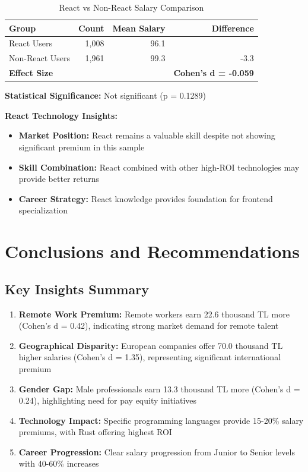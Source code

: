\documentclass[12pt,a4paper]{article}
\begin{document}
\begin{table}[H]
\centering
\begin{tabular}{lrrr}
\toprule
\textbf{Group} & \textbf{Count} & \textbf{Mean Salary} & \textbf{Difference} \\
\midrule
React Users & 1,008 & 96.1 & \\
Non-React Users & 1,961 & 99.3 & -3.3 \\
\midrule
\textbf{Effect Size} & & & \textbf{Cohen's d = -0.059} \\
\bottomrule
\end{tabular}
\caption{React vs Non-React Salary Comparison}
\end{table}

\textbf{Statistical Significance:} Not significant (p = 0.1289)

\textbf{React Technology Insights:}
\begin{itemize}
    \item \textbf{Market Position:} React remains a valuable skill despite not showing significant premium in this sample
    \item \textbf{Skill Combination:} React combined with other high-ROI technologies may provide better returns
    \item \textbf{Career Strategy:} React knowledge provides foundation for frontend specialization
\end{itemize}

\section{Conclusions and Recommendations}

\subsection{Key Insights Summary}
\begin{enumerate}
    \item \textbf{Remote Work Premium:} Remote workers earn 22.6 thousand TL more (Cohen's d = 0.42), indicating strong market demand for remote talent
    \item \textbf{Geographical Disparity:} European companies offer 70.0 thousand TL higher salaries (Cohen's d = 1.35), representing significant international premium
    \item \textbf{Gender Gap:} Male professionals earn 13.3 thousand TL more (Cohen's d = 0.24), highlighting need for pay equity initiatives
    \item \textbf{Technology Impact:} Specific programming languages provide 15-20\% salary premiums, with Rust offering highest ROI
    \item \textbf{Career Progression:} Clear salary progression from Junior to Senior levels with 40-60\% increases
\end{enumerate}
\end{document}
